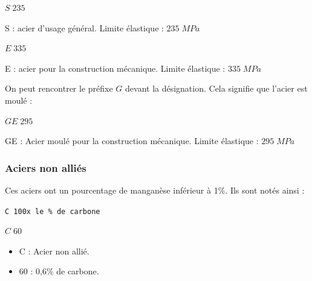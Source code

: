 \documentclass[11pt,oneside]{article}
\begin{document}
\begin{exemple}

\begin{minipage}[c]{.3\linewidth}
\begin{center}
$ S\; 235 $
\end{center}
\end{minipage} \hfill
\begin{minipage}[c]{.6\linewidth}
S : acier d'usage général. Limite élastique : $235\;MPa$
\end{minipage}

\begin{minipage}[c]{.3\linewidth}
\begin{center}
$ E\; 335 $
\end{center}
\end{minipage} \hfill
\begin{minipage}[c]{.6\linewidth}
E : acier pour la construction mécanique. Limite élastique : $335\;MPa$
\end{minipage}
\end{exemple}

\begin{rem}
On peut rencontrer le préfixe $G$ devant la désignation. Cela signifie que l'acier est moulé : 
\begin{minipage}[c]{.3\linewidth}
\begin{center}
$ GE\; 295 $
\end{center}
\end{minipage} \hfill
\begin{minipage}[c]{.6\linewidth}
GE : Acier moulé pour la construction mécanique. Limite élastique : $295\;MPa$
\end{minipage}
\end{rem}



\subsubsection{Aciers non alliés}
\begin{resultat}
Ces aciers ont un pourcentage de manganèse inférieur à 1\%. Ils sont notés ainsi :

\begin{center}
\texttt{C \hspace{1cm} 100x le \% de carbone}
\end{center}

\end{resultat}

\begin{exemple}
\begin{minipage}[c]{.3\linewidth}
\begin{center}
$ C\; 60$
\end{center}
\end{minipage} \hfill
\begin{minipage}[c]{.6\linewidth}
\begin{itemize}
\item C : Acier non allié. 
\item 60 : 0,6\% de carbone. 
\end{itemize}
\end{minipage}
\end{exemple}
\end{document}
